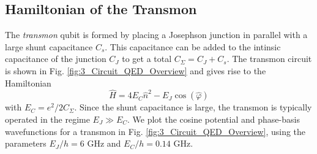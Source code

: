 \subsection{Hamiltonian of the Transmon}

The \textit{transmon} qubit is formed by placing a Josephson junction in parallel with a large shunt capacitance $C_s$. This capacitance can be added to the intinsic capacitance of the junction $C_J$ to get a total $C_\Sigma = C_J + C_s$. The transmon circuit is shown in Fig. \ref{fig:3_Circuit_QED_Overview} and gives rise to the Hamiltonian
\begin{equation}
    \hat{H} = 4E_C\hat{n}^2 - E_J\cos(\hat{\varphi})
    \label{eq:3_transmon_H}
\end{equation}
with $E_C = e^2/2C_\Sigma$. Since the shunt capacitance is large, the transmon is typically operated in the regime $E_J \gg E_C$. We plot the cosine potential and phase-basis wavefunctions for a transmon in Fig. \ref{fig:3_Circuit_QED_Overview}, using the parameters $E_J/h = 6$ GHz and $E_C/h = 0.14$ GHz. 

